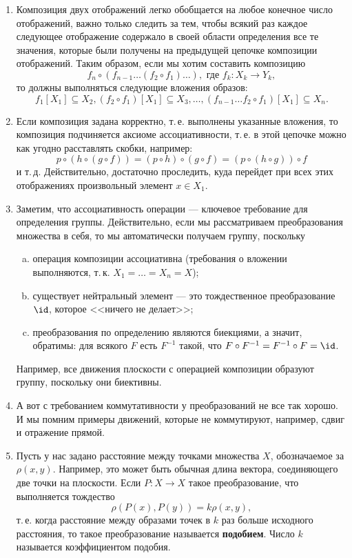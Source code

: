 \begin{enumerate}
\item Композиция двух отображений легко обобщается на любое конечное число отображений, важно только следить за тем, чтобы всякий раз каждое следующее отображение содержало в своей области определения все те значения, которые были получены на предыдущей цепочке композиции отображений. Таким образом, если мы хотим составить композицию
$$
f_n\circ (f_{n-1}\dots (f_2\circ f_1)\dots),\mbox{ где }f_k:X_k\to Y_k,
$$
то должны выполняться следующие вложения образов:
$$
f_1[X_1]\subseteq X_2,(f_2\circ f_1)[X_1]\subseteq X_3,\dots,(f_{n-1}\dots f_2\circ f_1)[X_1]\subseteq X_n.
$$
\item Если композиция задана корректно, т.\,е. выполнены указанные вложения, то композиция подчиняется аксиоме ассоциативности, т.\,е. в этой цепочке можно как угодно расставлять скобки, например:
$$
p\circ (h\circ (g\circ f)) = (p\circ h)\circ (g\circ f) = (p\circ (h\circ g))\circ f
$$
и т.\,д. Действительно, достаточно проследить, куда перейдет при всех этих отображениях произвольный элемент $x\in X_1$.
\item Заметим, что ассоциативность операции --- ключевое требование для определения группы. Действительно, если мы рассматриваем преобразования множества в себя, то мы автоматически получаем группу, поскольку
\begin{enumerate}[a)]
\item операция композиции ассоциативна (требования о вложении выполняются, т.\,к. $X_1=\dots=X_n=X$);
\item существует нейтральный элемент --- это тождественное преобразование $\id$, которое <<ничего не делает>>;
\item преобразования по определению являются биекциями, а значит, обратимы: для всякого $F$ есть $F^{-1}$ такой, что $F\circ F^{-1}=F^{-1}\circ F=\id$.
\end{enumerate}
Например, все движения плоскости с операцией композиции образуют группу, поскольку они биективны.
\item А вот с требованием коммутативности у преобразований не все так хорошо. И мы помним примеры движений, которые не коммутируют, например, сдвиг и отражение прямой.





\item Пусть у нас задано расстояние между точками множества $X$, обозначаемое за $\rho(x,y)$. Например, это может быть обычная длина вектора, соединяющего две точки на плоскости. Если $P:X\to X$ такое преобразование, что выполняется тождество
$$
\rho(P(x),P(y)) = k\rho(x,y),
$$
т.\,е. когда расстояние между образами точек в $k$ раз больше исходного расстояния, то такое преобразование называется \textbf{подобием}. Число $k$ называется коэффициентом подобия.


\end{enumerate}
